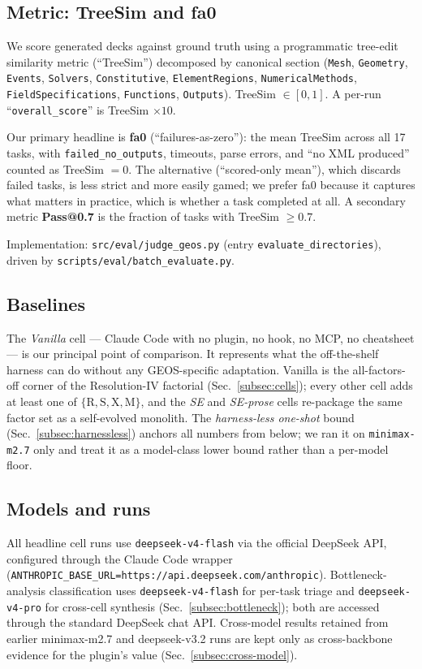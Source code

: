 \documentclass{article}
\begin{document}
\subsection{Metric: TreeSim and fa0}
\label{subsec:metric}
We score generated decks against ground truth using a programmatic tree-edit similarity metric (``TreeSim'') decomposed by canonical section (\texttt{Mesh}, \texttt{Geometry}, \texttt{Events}, \texttt{Solvers}, \texttt{Constitutive}, \texttt{ElementRegions}, \texttt{NumericalMethods}, \texttt{FieldSpecifications}, \texttt{Functions}, \texttt{Outputs}). TreeSim $\in [0, 1]$. A per-run ``\texttt{overall\_score}'' is TreeSim $\times 10$.

Our primary headline is \textbf{fa0} (``failures-as-zero''): the mean TreeSim across all 17 tasks, with \texttt{failed\_no\_outputs}, timeouts, parse errors, and ``no XML produced'' counted as TreeSim $= 0$. The alternative (``scored-only mean''), which discards failed tasks, is less strict and more easily gamed; we prefer fa0 because it captures what matters in practice, which is whether a task completed at all. A secondary metric \textbf{Pass@0.7} is the fraction of tasks with TreeSim $\geq 0.7$.

Implementation: \texttt{src/eval/judge\_geos.py} (entry \texttt{evaluate\_directories}), driven by \texttt{scripts/eval/batch\_evaluate.py}.

\subsection{Baselines}
\label{subsec:baselines}
The \emph{Vanilla} cell --- Claude Code with no plugin, no hook, no MCP, no cheatsheet --- is our principal point of comparison. It represents what the off-the-shelf harness can do without any GEOS-specific adaptation. Vanilla is the all-factors-off corner of the Resolution-IV factorial (Sec.~\ref{subsec:cells}); every other cell adds at least one of $\{\mathrm{R, S, X, M}\}$, and the \emph{SE} and \emph{SE-prose} cells re-package the same factor set as a self-evolved monolith. The \emph{harness-less one-shot} bound (Sec.~\ref{subsec:harnessless}) anchors all numbers from below; we ran it on \texttt{minimax-m2.7} only and treat it as a model-class lower bound rather than a per-model floor.

\subsection{Models and runs}
All headline cell runs use \texttt{deepseek-v4-flash} via the official DeepSeek API, configured through the Claude Code wrapper (\texttt{ANTHROPIC\_BASE\_URL=https://api.deepseek.com/anthropic}). Bottleneck-analysis classification uses \texttt{deepseek-v4-flash} for per-task triage and \texttt{deepseek-v4-pro} for cross-cell synthesis (Sec.~\ref{subsec:bottleneck}); both are accessed through the standard DeepSeek chat API. Cross-model results retained from earlier minimax-m2.7 and deepseek-v3.2 runs are kept only as cross-backbone evidence for the plugin's value (Sec.~\ref{subsec:cross-model}).
\end{document}
